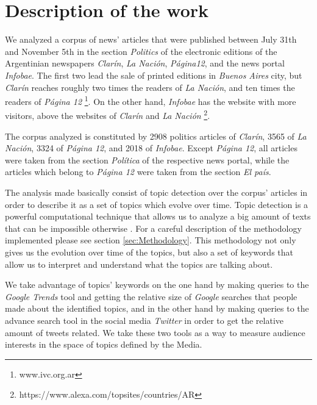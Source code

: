 
\section{Description of the work}
\label{sec:description}

\par We analyzed a corpus of news' articles that were published between July 31th and November 5th in the section \emph{Politics} of the electronic editions of the Argentinian newspapers \emph{Clarín}, \emph{La Nación}, \emph{Página12}, and the news portal \emph{Infobae}.
The first two lead the sale of printed editions in \emph{Buenos Aires} city, but \emph{Clarín} reaches roughly two times the readers of \emph{La Nación}, and ten times the readers of \emph{Página 12} \footnote{www.ivc.org.ar}. On the other hand, \emph{Infobae} has the website with more visitors, above the websites of \emph{Clarín} and \emph{La Nación} \footnote{https://www.alexa.com/topsites/countries/AR}.

\par The corpus analyzed is constituted by 2908 politics articles of \emph{Clarín}, 3565 of \emph{La Nación}, 3324 of \emph{Página 12}, and 2018 of \emph{Infobae}. Except \emph{Página 12}, all articles were taken from the section \emph{Política} of the respective news portal, while the articles which belong to \emph{Página 12} were taken from the section \emph{El país}.

\par The analysis made basically consist of topic detection over the corpus' articles in order to describe it as a set of topics which evolve over time. Topic detection is a powerful computational technique that allows us to analyze a big amount of texts that can be impossible otherwise \cite{griffiths2004finding}. For a careful description of the methodology implemented please see section \ref{sec:Methodology}. 
This methodology not only gives us the evolution over time of the topics, but also a set of keywords that allow us to interpret and understand what the topics are talking about. 
\par We take advantage of topics' keywords on the one hand by making queries to the \emph{Google Trends} tool and getting the relative size of \emph{Google} searches that people made about the identified topics, and in the other hand by making queries to the advance search tool in the social media \emph{Twitter} in order to get the relative amount of tweets related. 
We take these two tools as a way to measure audience interests in the space of topics defined by the Media.


